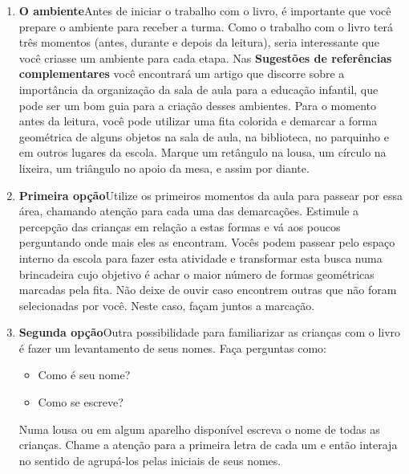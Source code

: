 \documentclass[11pt]{extarticle}
\begin{document}

\begin{enumerate}
\item \textbf{O ambiente}\quad Antes de iniciar o trabalho com o livro, é importante que você 
prepare o ambiente para receber a turma. Como o trabalho com o livro terá 
três momentos (antes, durante e depois da leitura), seria interessante que você 
criasse um ambiente para cada etapa. Nas \textbf{Sugestões de referências complementares} 
você encontrará um artigo que discorre sobre a importância da organização da sala 
de aula para a educação infantil, que pode ser um bom guia para a criação desses 
ambientes. Para o momento antes da leitura, você pode utilizar uma fita colorida
e demarcar a forma geométrica de alguns objetos na sala de aula, na biblioteca,
no parquinho e em outros lugares da escola. Marque um retângulo na lousa, 
um círculo na lixeira, um triângulo no apoio da mesa, e assim por diante. 


\item \textbf{Primeira opção}\quad Utilize os primeiros 
momentos da aula para passear por essa área, chamando atenção para cada uma
das demarcações. Estimule a percepção das crianças em relação a estas formas e
vá aos poucos perguntando onde mais eles as encontram. Vocês podem passear pelo espaço interno
da escola para fazer esta atividade e transformar esta busca numa brincadeira
cujo objetivo é achar o maior número de formas geométricas marcadas pela fita. 
Não deixe de ouvir caso encontrem outras que não foram selecionadas por você.
Neste caso, façam juntos a marcação.
\item \textbf{Segunda opção}\quad Outra possibilidade para familiarizar 
as crianças com o livro é fazer um levantamento de seus nomes. Faça perguntas como:
\begin{itemize}
	\item Como é seu nome? 
	\item Como se escreve?
\end{itemize}
Numa lousa ou em algum aparelho disponível escreva o nome de todas as crianças.
Chame a atenção para a primeira letra de cada um e então interaja no sentido 
de agrupá-los pelas iniciais de seus nomes.

\end{enumerate}
\end{document}
